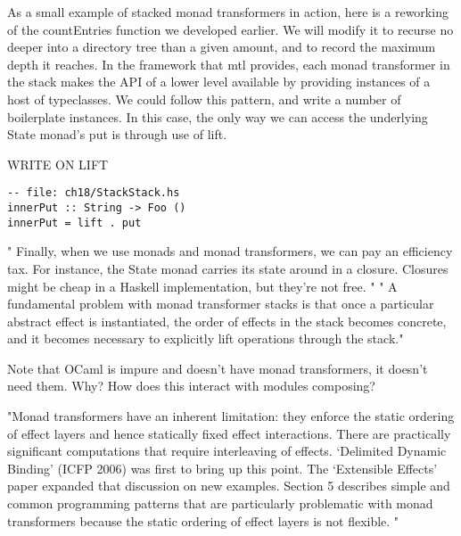 As a small example of stacked monad transformers in action, here is a reworking of the countEntries function we developed earlier. We will modify it to recurse no deeper into a directory tree than a given amount, and to record the maximum depth it reaches.
In the framework that mtl provides, each monad transformer in the stack makes the API of a lower level available by providing instances of a host of typeclasses. We could follow this pattern, and write a number of boilerplate instances.
In this case, the only way we can access the underlying State monad's put is through use of lift.

WRITE ON LIFT
\begin{verbatim}
-- file: ch18/StackStack.hs
innerPut :: String -> Foo ()
innerPut = lift . put
\end{verbatim}

"
Finally, when we use monads and monad transformers, we can pay an efficiency tax.
For instance, the State monad carries its state around in a closure.
Closures might be cheap in a Haskell implementation, but they're not free.
"
\cite{o2008real}
"
A fundamental problem with monad transformer stacks is that
once a particular abstract effect is instantiated,
the order of effects in the stack becomes concrete,
and it becomes necessary to explicitly lift operations
through the stack."
\cite{kammar2013handlers}

Note that OCaml is impure and doesn't have monad transformers,
it doesn't need them.
Why?
How does this interact with modules composing?

"Monad transformers have an inherent limitation:
they enforce the static ordering of effect layers and hence statically fixed effect interactions.
There are practically significant computations that require interleaving of effects.
‘Delimited Dynamic Binding’ (ICFP 2006) was first to bring up this point.
The ‘Extensible Effects’ paper expanded that discussion on new examples.
Section 5 describes simple and common programming patterns that are particularly
problematic with monad transformers because the static ordering of effect layers is not flexible.
"

